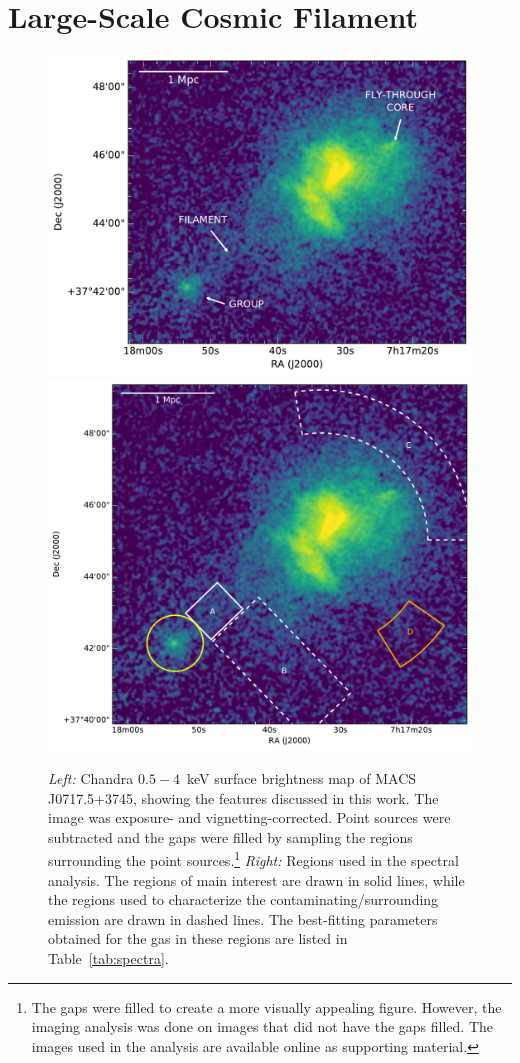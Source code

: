\section{Large-Scale Cosmic Filament}
\label{sec:Filament}

\begin{figure}
    \includegraphics[width=\columnwidth]{plots/fil-labels.pdf}
    \includegraphics[width=\columnwidth]{plots/fil-regions.pdf}
    \caption{\emph{Left:} Chandra $0.5-4$~keV surface brightness map of MACS J0717.5+3745, showing the features discussed in this work. The image was exposure- and vignetting-corrected. Point sources were subtracted and the gaps were filled by sampling the regions surrounding the point sources.\footnote{The gaps were filled to create a more visually appealing figure. However, the imaging analysis was done on images that did not have the gaps filled. The images used in the analysis are available online as supporting material.} \emph{Right:} Regions used in the spectral analysis. The regions of main interest are drawn in solid lines, while the regions used to characterize the contaminating/surrounding emission are drawn in dashed lines. The best-fitting parameters obtained for the gas in these regions are listed in Table~\ref{tab:spectra}. \label{fig:fil}}

\end{figure}
